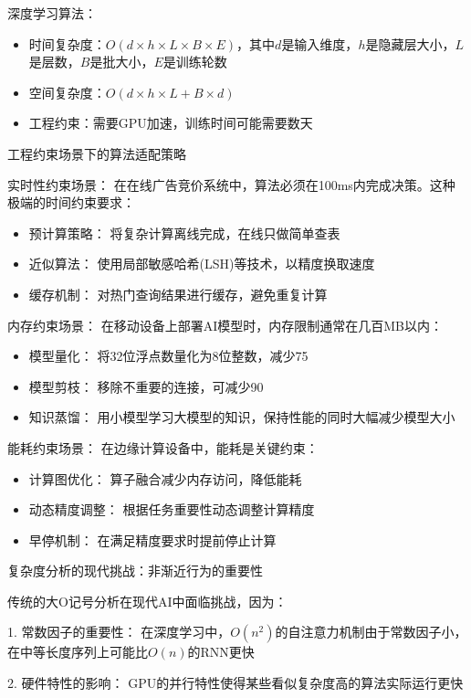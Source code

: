 深度学习算法：
\begin{itemize}
\item 时间复杂度：$O(d \times h \times L \times B \times E)$，其中$d$是输入维度，$h$是隐藏层大小，$L$是层数，$B$是批大小，$E$是训练轮数
\item 空间复杂度：$O(d \times h \times L + B \times d)$
\item 工程约束：需要GPU加速，训练时间可能需要数天
\end{itemize}

工程约束场景下的算法适配策略

实时性约束场景：
在在线广告竞价系统中，算法必须在100ms内完成决策。这种极端的时间约束要求：

\begin{itemize}
\item 预计算策略： 将复杂计算离线完成，在线只做简单查表
\item 近似算法： 使用局部敏感哈希(LSH)等技术，以精度换取速度
\item 缓存机制： 对热门查询结果进行缓存，避免重复计算
\end{itemize}

内存约束场景：
在移动设备上部署AI模型时，内存限制通常在几百MB以内：

\begin{itemize}
\item 模型量化： 将32位浮点数量化为8位整数，减少75%
\item 模型剪枝： 移除不重要的连接，可减少90%
\item 知识蒸馏： 用小模型学习大模型的知识，保持性能的同时大幅减少模型大小
\end{itemize}

能耗约束场景：
在边缘计算设备中，能耗是关键约束：

\begin{itemize}
\item 计算图优化： 算子融合减少内存访问，降低能耗
\item 动态精度调整： 根据任务重要性动态调整计算精度
\item 早停机制： 在满足精度要求时提前停止计算
\end{itemize}

复杂度分析的现代挑战：非渐近行为的重要性

传统的大O记号分析在现代AI中面临挑战，因为：

1. 常数因子的重要性： 在深度学习中，$O(n^2)$的自注意力机制由于常数因子小，在中等长度序列上可能比$O(n)$的RNN更快

2. 硬件特性的影响： GPU的并行特性使得某些看似复杂度高的算法实际运行更快


